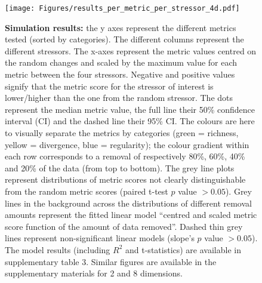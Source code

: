 \documentclass[12pt,letterpaper]{article}
\providecommand{\DIFaddbeginFL}{} %
\providecommand{\DIFaddendFL}{} %
\providecommand{\DIFdelbeginFL}{} %
\providecommand{\DIFdelendFL}{} %
\newcommand{\DIFscaledelfig}{0.5}
\newlength{\DIFdelgraphicswidth} %
\newlength{\DIFdelgraphicsheight} %
\newcommand{\DIFaddincludegraphics}[2][]{{\color{blue}\fbox{\DIFOincludegraphics[#1]{#2}}}} %
\newcommand{\DIFdelincludegraphics}[2][]{%
\sbox{\DIFdelgraphicsbox}{\DIFOincludegraphics[#1]{#2}}%
\settoboxwidth{\DIFdelgraphicswidth}{\DIFdelgraphicsbox} %
\settoboxtotalheight{\DIFdelgraphicsheight}{\DIFdelgraphicsbox} %
\scalebox{\DIFscaledelfig}{%
\parbox[b]{\DIFdelgraphicswidth}{\usebox{\DIFdelgraphicsbox}\\[-\baselineskip] \rule{\DIFdelgraphicswidth}{0em}}\llap{\resizebox{\DIFdelgraphicswidth}{\DIFdelgraphicsheight}{%
\setlength{\unitlength}{\DIFdelgraphicswidth}%
\begin{picture}(1,1)%
\thicklines\linethickness{2pt} %
{\color[rgb]{1,0,0}\put(0,0){\framebox(1,1){}}}%
{\color[rgb]{1,0,0}\put(0,0){\line( 1,1){1}}}%
{\color[rgb]{1,0,0}\put(0,1){\line(1,-1){1}}}%
\end{picture}%
}\hspace*{3pt}}} %
} %
\DeclareRobustCommand{\DIFaddbeginFL}{\DIFOaddbeginFL \let\includegraphics\DIFaddincludegraphics} %
\DeclareRobustCommand{\DIFaddendFL}{\DIFOaddendFL \let\includegraphics\DIFOincludegraphics} %
\DeclareRobustCommand{\DIFdelbeginFL}{\DIFOdelbeginFL \let\includegraphics\DIFdelincludegraphics} %
\DeclareRobustCommand{\DIFdelendFL}{\DIFOaddendFL \let\includegraphics\DIFOincludegraphics} %
\begin{document}
\begin{figure}[!htbp]
\centering
   \texttt{[image: Figures/results\_per\_metric\_per\_stressor\_4d.pdf]}
\caption{\DIFdelbeginFL %
\DIFdelendFL \DIFaddbeginFL \scriptsize{\textbf{Simulation results:} the y axes represent the different metrics tested (sorted by categories).
The different columns represent the different stressors. The x-axes represent the metric values centred on the random changes and scaled by the maximum value for each metric between the four stressors.
Negative and positive values signify that the metric score for the stressor of interest is lower/higher than the one from the random stressor.
The dots represent the median metric value, the full line their 50\% confidence interval (CI) and the dashed line their 95\% CI.
The colours are here to visually separate the metrics by categories (green = richness, yellow = divergence, blue = regularity); the colour gradient within each row corresponds to a removal of respectively 80\%, 60\%, 40\% and 20\% of the data (from top to bottom).
The grey line plots represent distributions of metric scores not clearly distinguishable from the random metric scores (paired t-test $p$ value $> 0.05$).
Grey lines in the background across the distributions of different removal amounts represent the fitted linear model ``centred and scaled metric score function of the amount of data removed''.
Dashed thin grey lines represent non-significant linear models (slope's $p$ value $> 0.05$).
The model results (including $R^{2}$ and t-statistics) are available in supplementary table 3.
Similar figures are available in the supplementary materials for 2 and 8 dimensions.}\DIFaddendFL }
\label{Fig:simulation_results}
\end{figure}
\bigskip
\end{document}

